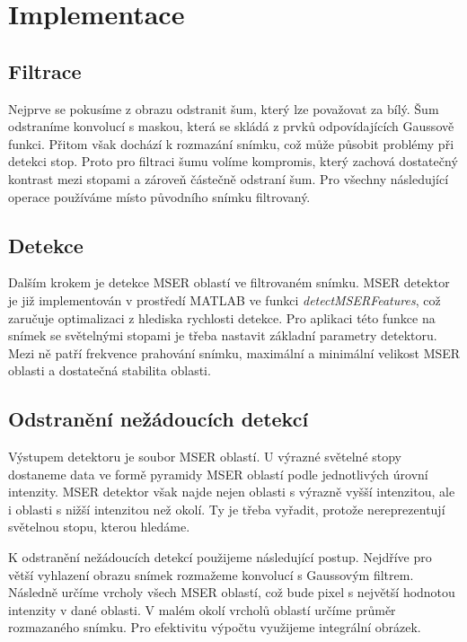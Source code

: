 \section*{Implementace}

\subsection*{Filtrace}
   Nejprve se pokusíme z obrazu odstranit šum, který lze považovat za bílý. Šum odstraníme konvolucí s maskou, která se skládá z prvků odpovídajících Gaussově funkci. Přitom však dochází k rozmazání snímku, což může působit problémy při detekci stop. Proto pro filtraci šumu volíme kompromis, který zachová dostatečný kontrast mezi stopami a zároveň částečně odstraní šum. Pro všechny následující operace používáme místo původního snímku filtrovaný.    

\subsection*{Detekce} 
   Dalším krokem je detekce MSER oblastí ve filtrovaném snímku. MSER detektor je již implementován v prostředí MATLAB ve funkci \textit{detectMSERFeatures}, což zaručuje optimalizaci z hlediska rychlosti detekce. Pro aplikaci této funkce na snímek se světelnými stopami je třeba nastavit základní parametry detektoru. Mezi ně patří frekvence prahování snímku, maximální a minimální velikost MSER oblasti a dostatečná stabilita oblasti. 

\subsection*{Odstranění nežádoucích detekcí}

Výstupem detektoru je soubor MSER oblastí. U výrazné světelné stopy dostaneme data ve formě pyramidy MSER oblastí podle jednotlivých úrovní intenzity. MSER detektor však najde nejen oblasti s výrazně vyšší intenzitou, ale i oblasti s nižší intenzitou než okolí. Ty je třeba vyřadit, protože nereprezentují světelnou stopu, kterou hledáme. 

K odstranění nežádoucích detekcí použijeme následující postup. Nejdříve pro větší vyhlazení obrazu snímek rozmažeme konvolucí s Gaussovým filtrem. Následně určíme vrcholy všech MSER oblastí, což bude pixel s největší hodnotou intenzity v dané oblasti. V malém okolí vrcholů oblastí určíme průměr rozmazaného snímku. Pro efektivitu výpočtu využijeme integrální obrázek.

